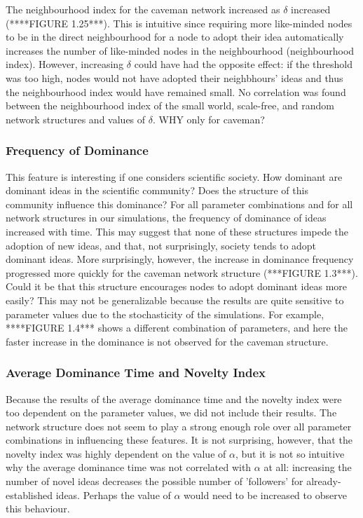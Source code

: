 The neighbourhood index for the caveman network increased as $\delta$ increased (****FIGURE 1.25***). This is intuitive since requiring more like-minded nodes to be in the direct neighbourhood for a node to adopt their idea automatically increases the number of like-minded nodes in the neighbourhood (neighbourhood index). However, increasing $\delta$ could have had the opposite effect: if the threshold was too high, nodes would not have adopted their neighbhours' ideas and thus the neighbourhood index would have remained small. No correlation was found between the neighbourhood index of the small world, scale-free, and random network structures and values of $\delta$. WHY only for caveman?

\subsubsection{Frequency of Dominance}

This feature is interesting if one considers scientific society. How dominant are dominant ideas in the scientific community? Does the structure of this community influence this dominance? For all parameter combinations and for all network structures in our simulations, the frequency of dominance of ideas increased with time. This may suggest that none of these structures impede the adoption of new ideas, and that, not surprisingly, society tends to adopt dominant ideas. More surprisingly, however, the increase in dominance frequency progressed more quickly for the caveman network structure (***FIGURE 1.3***). Could it be that this structure encourages nodes to adopt dominant ideas more easily? This may not be generalizable because the results are quite sensitive to parameter values due to the stochasticity of the simulations. For example, ****FIGURE 1.4*** shows a different combination of parameters, and here the faster increase in the dominance is not observed for the caveman structure.


\subsubsection{Average Dominance Time and Novelty Index}


Because the results of the average dominance time and the novelty index were too dependent on the parameter values, we did not include their results. The network structure does not seem to play a strong enough role over all parameter combinations in influencing these features. It is not surprising, however, that the novelty index was highly dependent on the value of $\alpha$, but it is not so intuitive why the average dominance time was not correlated with $\alpha$ at all: increasing the number of novel ideas decreases the possible number of 'followers' for already-established ideas. Perhaps the value of $\alpha$ would need to be increased to observe this behaviour.



